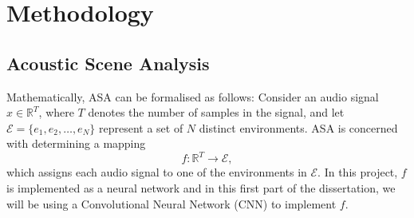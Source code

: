 \documentclass[logo,bsc,singlespacing,parskip,online]{infthesis}
\begin{document}
\chapter{Methodology}



\section{Acoustic Scene Analysis}
\label{sec:methodology-asa}
Mathematically, ASA can be formalised as follows:
Consider an audio signal \(x \in \mathbb{R}^{T}\), where \(T\) denotes the number of samples in the signal, and let \(\mathcal{E} = \{e_1, e_2, \ldots, e_N\}\) represent a set of \(N\) distinct environments. ASA is concerned with determining a mapping 
\[
f: \mathbb{R}^{T} \rightarrow \mathcal{E},
\]
which assigns each audio signal to one of the environments in \(\mathcal{E}\). In this project, \(f\) is implemented as a neural network
and in this first part of the dissertation, we will be using a Convolutional Neural Network (CNN) to implement \(f\).
\end{document}
